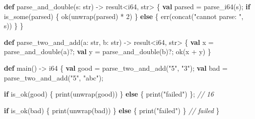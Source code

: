 \documentclass[
  english,
]{book}
\newenvironment{Shaded}{\begin{snugshade}}{\end{snugshade}}
\newcommand{\CommentTok}[1]{\textcolor[rgb]{0.42,0.60,0.33}{\textit{#1}}}
\newcommand{\ControlFlowTok}[1]{\textcolor[rgb]{0.77,0.53,0.75}{\textbf{#1}}}
\newcommand{\DataTypeTok}[1]{\textcolor[rgb]{0.31,0.79,0.69}{#1}}
\newcommand{\DecValTok}[1]{\textcolor[rgb]{0.71,0.81,0.66}{#1}}
\newcommand{\FunctionTok}[1]{\textcolor[rgb]{0.86,0.86,0.67}{#1}}
\newcommand{\KeywordTok}[1]{\textcolor[rgb]{0.34,0.61,0.84}{\textbf{#1}}}
\newcommand{\NormalTok}[1]{\textcolor[rgb]{0.83,0.83,0.83}{#1}}
\newcommand{\OperatorTok}[1]{\textcolor[rgb]{0.83,0.83,0.83}{#1}}
\newcommand{\StringTok}[1]{\textcolor[rgb]{0.81,0.57,0.47}{#1}}
\begin{document}
\begin{Shaded}
\begin{Highlighting}[]
\KeywordTok{def}\NormalTok{ parse\_and\_double(s: }\DataTypeTok{str}\NormalTok{) }\OperatorTok{{-}\textgreater{}} \DataTypeTok{result}\OperatorTok{\textless{}}\DataTypeTok{i64}\NormalTok{, }\DataTypeTok{str}\OperatorTok{\textgreater{}}\NormalTok{ \{}
    \KeywordTok{val}\NormalTok{ parsed }\OperatorTok{=} \FunctionTok{parse\_i64}\NormalTok{(s);}
    \ControlFlowTok{if} \FunctionTok{is\_some}\NormalTok{(parsed) \{}
        \FunctionTok{ok}\NormalTok{(unwrap(parsed) }\OperatorTok{*} \DecValTok{2}\NormalTok{)}
\NormalTok{    \} }\ControlFlowTok{else}\NormalTok{ \{}
        \FunctionTok{err}\NormalTok{(}\FunctionTok{concat}\NormalTok{(}\StringTok{"cannot parse: "}\NormalTok{, s))}
\NormalTok{    \}}
\NormalTok{\}}

\KeywordTok{def}\NormalTok{ parse\_two\_and\_add(a: }\DataTypeTok{str}\NormalTok{, b: }\DataTypeTok{str}\NormalTok{) }\OperatorTok{{-}\textgreater{}} \DataTypeTok{result}\OperatorTok{\textless{}}\DataTypeTok{i64}\NormalTok{, }\DataTypeTok{str}\OperatorTok{\textgreater{}}\NormalTok{ \{}
    \KeywordTok{val}\NormalTok{ x }\OperatorTok{=}\NormalTok{ parse\_and\_double(a)}\OperatorTok{?}\NormalTok{;}
    \KeywordTok{val}\NormalTok{ y }\OperatorTok{=}\NormalTok{ parse\_and\_double(b)}\OperatorTok{?}\NormalTok{;}
    \FunctionTok{ok}\NormalTok{(x }\OperatorTok{+}\NormalTok{ y)}
\NormalTok{\}}

\KeywordTok{def}\NormalTok{ main() }\OperatorTok{{-}\textgreater{}} \DataTypeTok{i64}\NormalTok{ \{}
    \KeywordTok{val}\NormalTok{ good }\OperatorTok{=}\NormalTok{ parse\_two\_and\_add(}\StringTok{"5"}\NormalTok{, }\StringTok{"3"}\NormalTok{);}
    \KeywordTok{val}\NormalTok{ bad  }\OperatorTok{=}\NormalTok{ parse\_two\_and\_add(}\StringTok{"5"}\NormalTok{, }\StringTok{"abc"}\NormalTok{);}

    \ControlFlowTok{if} \FunctionTok{is\_ok}\NormalTok{(good) \{ }\FunctionTok{print}\NormalTok{(unwrap(good)) \} }\ControlFlowTok{else}\NormalTok{ \{ }\FunctionTok{print}\NormalTok{(}\StringTok{"failed"}\NormalTok{) \};}
    \CommentTok{// 16}

    \ControlFlowTok{if} \FunctionTok{is\_ok}\NormalTok{(bad) \{ }\FunctionTok{print}\NormalTok{(unwrap(bad)) \} }\ControlFlowTok{else}\NormalTok{ \{ }\FunctionTok{print}\NormalTok{(}\StringTok{"failed"}\NormalTok{) \}}
    \CommentTok{// failed}
\NormalTok{\}}
\end{Highlighting}
\end{Shaded}
\end{document}
